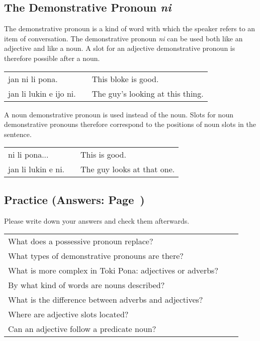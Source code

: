 \subsection*{The Demonstrative Pronoun \textit{ni}}
The demonstrative pronoun is a kind of word with which the speaker refers to an  item of conversation.
The demonstrative pronoun \textit{ni} can be used both like an adjective and like a noun.
A slot for an adjective demonstrative pronoun is therefore possible after a noun.

\begin{supertabular}{p{5,5cm}|ll}
    jan ni li pona.        &  & This bloke is good.              \\
    jan li lukin e ijo ni. &  & The guy's looking at this thing. \\
\end{supertabular}

A noun demonstrative pronoun is used instead of the noun.
Slots for noun demonstrative pronouns therefore correspond to the positions of noun slots in the sentence.

\begin{supertabular}{p{5,5cm}|ll}
    ni li pona...      &  & This is good.              \\
    jan li lukin e ni. &  & The guy looks at that one. \\
\end{supertabular}

\newpage

\subsection*{Practice (Answers: Page~\pageref{'adjectives'})}
Please write down your answers and check them afterwards.

\begin{supertabular}{p{5,5cm}|ll}
    What does a possessive pronoun replace?                   &  & \\
    What types of demonstrative pronouns are there?           &  & \\
    What is more complex in Toki Pona: adjectives or adverbs? &  & \\
    By what kind of words are nouns described?                &  & \\
    What is the difference between adverbs and adjectives?    &  & \\
    Where are adjective slots located?                        &  & \\
    Can an adjective follow a predicate noun?                 &  & \\
\end{supertabular}

